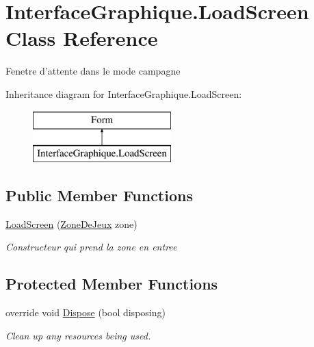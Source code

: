 \hypertarget{class_interface_graphique_1_1_load_screen}{\section{Interface\-Graphique.\-Load\-Screen Class Reference}
\label{class_interface_graphique_1_1_load_screen}
}


Fenetre d'attente dans le mode campagne  


Inheritance diagram for Interface\-Graphique.\-Load\-Screen\-:\begin{figure}[H]
\begin{center}
\leavevmode
\includegraphics[height=2.000000cm]{class_interface_graphique_1_1_load_screen}
\end{center}
\end{figure}
\subsection*{Public Member Functions}
\begin{DoxyCompactItemize}
\item 
\hyperlink{class_interface_graphique_1_1_load_screen_a1c86dd1c552b2da3f61c9062a78f7e7e}{Load\-Screen} (\hyperlink{class_interface_graphique_1_1_zone_de_jeux}{Zone\-De\-Jeux} zone)
\begin{DoxyCompactList}\small\item\em Constructeur qui prend la zone en entree \end{DoxyCompactList}\end{DoxyCompactItemize}
\subsection*{Protected Member Functions}
\begin{DoxyCompactItemize}
\item 
override void \hyperlink{class_interface_graphique_1_1_load_screen_a39f3794eaefb5160d8b8d384a90fbca7}{Dispose} (bool disposing)
\begin{DoxyCompactList}\small\item\em Clean up any resources being used. \end{DoxyCompactList}\end{DoxyCompactItemize}


